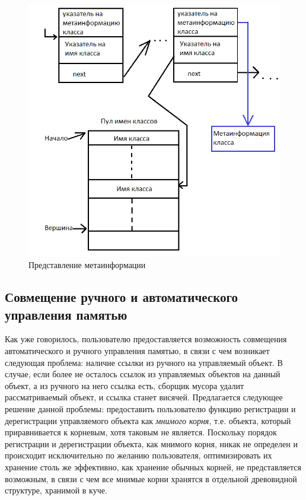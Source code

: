\begin{figure}[h!]
	\centering
	\includegraphics[width=350pt]{Berezun/images/picture2.png}
	\caption{Представление метаинформации}
\end{figure}

\subsection{Совмещение ручного и автоматического управления памятью}
Как уже говорилось, пользователю предоставляется возможность совмещения автоматического и ручного управления памятью,
в связи с чем возникает следующая проблема: наличие ссылки из ручного на управляемый объект.
В случае, если более не осталось ссылок из управляемых объектов на данный объект, а из ручного на него ссылка есть,
сборщик мусора удалит рассматриваемый объект, и ссылка станет висячей.
Предлагается следующее решение данной проблемы: предоставить пользователю функцию регистрации и дерегистрации управляемого объекта
как \textit{мнимого корня}, т.е. объекта, который приравнивается к корневым, хотя таковым не является.
Поскольку порядок регистрации и дерегистрации объекта, как мнимого корня, никак не определен и происходит исключительно по желанию пользователя, оптимизировать их хранение столь же эффективно, как хранение обычных корней, не представляется возможным,
в связи с чем все мнимые корни хранятся в отдельной древовидной структуре, хранимой в куче.

